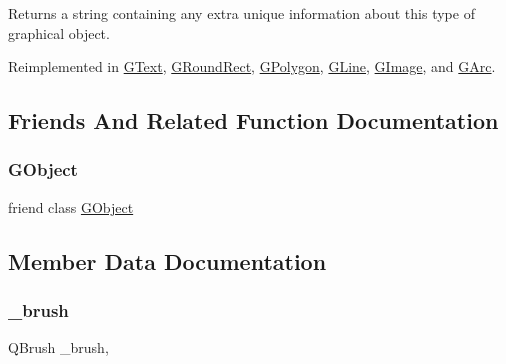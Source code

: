 Returns a string containing any extra unique information about this type of graphical object. 



Reimplemented in \mbox{\hyperlink{classGText_a85b5bcebac42ec5f130b0c3851383a23}{G\+Text}}, \mbox{\hyperlink{classGRoundRect_a85b5bcebac42ec5f130b0c3851383a23}{G\+Round\+Rect}}, \mbox{\hyperlink{classGPolygon_a4fcdf8de5c6de92242a975d83d8f23ea}{G\+Polygon}}, \mbox{\hyperlink{classGLine_a85b5bcebac42ec5f130b0c3851383a23}{G\+Line}}, \mbox{\hyperlink{classGImage_a85b5bcebac42ec5f130b0c3851383a23}{G\+Image}}, and \mbox{\hyperlink{classGArc_a85b5bcebac42ec5f130b0c3851383a23}{G\+Arc}}.



\subsection{Friends And Related Function Documentation}
\mbox{\label{classGCompound_ac45aa544268532ae1e01fee410b917bf}} 
\subsubsection{\texorpdfstring{G\+Object}{GObject}}
{\footnotesize\ttfamily friend class \mbox{\hyperlink{classGObject}{G\+Object}}\hspace{0.3cm}{\ttfamily [friend]}}



\subsection{Member Data Documentation}
\mbox{\label{classGObject_aab24462ec896b596d99911767b0912d0}} 
\subsubsection{\texorpdfstring{\+\_\+brush}{\_brush}}
{\footnotesize\ttfamily Q\+Brush \+\_\+brush\hspace{0.3cm}{\ttfamily [protected]}, {\ttfamily [inherited]}}

\mbox{\label{classGObject_a1134e770ae4315ea8bc1201e2f21da8b}} 
